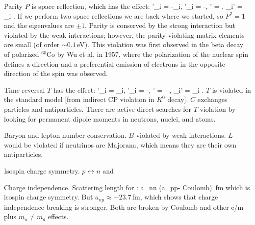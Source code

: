  \I Parity $P$ is space reflection, which has the effect:
  \beq
    \rvec'_i = -\rvec_i\;, \quad \kvec'_i = -\kvec \;, \quad
      ' =  \;, \quad \taubold_i' = \taubold_i \;.
  \eeq
If we perform two space reflections we are back where we started, so
$P^2 = 1$ and the eigenvalues are $\pm 1$.
Parity is conserved by the strong interaction but
violated by the weak interactions; however, the parity-violating matrix elements
are small (of order $\sim0.1\,$eV).  This violation
was first observed in the beta decay of polarized $^{60}$Co
by Wu et al. in 1957, where the polarization of the nuclear spin defines a direction and
a preferential emission of electrons in the opposite direction of the spin was observed.


 \I Time reversal $T$ has the effect: 
  \beq
    \rvec'_i = \rvec_i\;, \quad \kvec'_i = -\kvec \;, \quad
      ' = - \;, \quad \taubold_i' = \taubold_i \;.
  \eeq
  $T$ is violated in the standard model [from indirect CP violation in $K^0$ decay].
  $C$ exchanges particles and antiparticles.  There are active
  direct searches for $T$ violation by looking for permanent dipole
  moments in neutrons, nuclei,  and atoms.

  \I Baryon and lepton number conservation.
  $B$ violated by weak interactions.  $L$ would be violated if
  neutrinos are Majorana, which means they are their own antiparticles.

 \I Isospin charge symmetry.
    $p\leftrightarrow n$ and 

    Charge independence.  Scattering length for \Ssinglet: 
    \beq
      a_{nn} \approx (a_{pp}- \mbox{Coulomb}) \,\mbox{fm} 
    \eeq 
    which is isospin charge symmetry.  But $a_{np} \approx -23.7\,$fm, which shows that
    charge independence breaking is stronger.
    Both are broken by Coulomb and other e/m plus $m_u \neq m_d$ effects.
\ee

